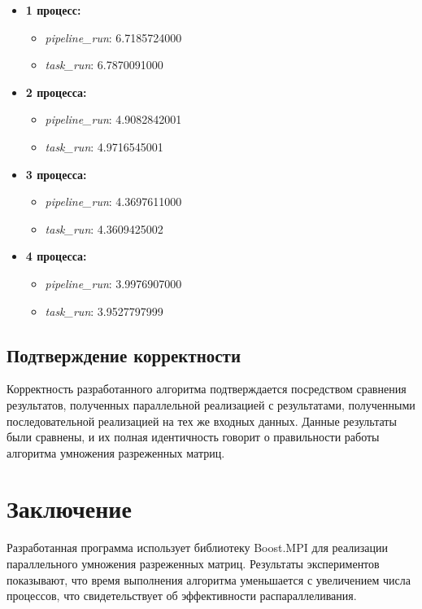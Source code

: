 \documentclass[12pt]{article}
\begin{document}
\begin{itemize}
    \item \textbf{1 процесс:}
        \begin{itemize}
            \item \textit{pipeline\_run}: 6.7185724000
            \item \textit{task\_run}:  6.7870091000
        \end{itemize}
    \item \textbf{2 процесса:}
        \begin{itemize}
            \item \textit{pipeline\_run}: 4.9082842001
            \item \textit{task\_run}: 4.9716545001
        \end{itemize}
     \item \textbf{3 процесса:}
        \begin{itemize}
            \item \textit{pipeline\_run}: 4.3697611000
             \item \textit{task\_run}: 4.3609425002
        \end{itemize}
     \item \textbf{4 процесса:}
        \begin{itemize}
             \item \textit{pipeline\_run}: 3.9976907000
            \item \textit{task\_run}: 3.9527797999
        \end{itemize}
\end{itemize}

\subsection*{Подтверждение корректности}
\label{subsec:correctness_verification}
Корректность разработанного алгоритма подтверждается посредством сравнения результатов, полученных параллельной реализацией с результатами, полученными последовательной реализацией на тех же входных данных. Данные результаты были сравнены, и их полная идентичность говорит о правильности работы алгоритма умножения разреженных матриц.


\section*{Заключение}
Разработанная программа использует библиотеку Boost.MPI для реализации параллельного умножения разреженных матриц. Результаты экспериментов показывают, что время выполнения алгоритма уменьшается с увеличением числа процессов, что свидетельствует об эффективности распараллеливания.
\newpage
\end{document}
